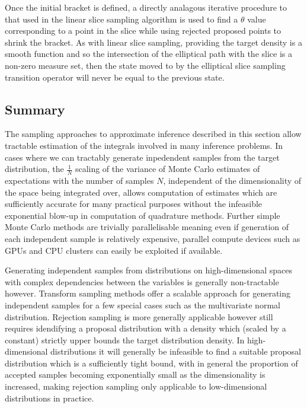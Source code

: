 Once the initial bracket is defined, a directly analagous iterative procedure to that used in the linear slice sampling algorithm is used to find a $\theta$ value corresponding to a point in the slice while using rejected proposed points to shrink the bracket. As with linear slice sampling, providing the target density is a smooth function and so the intersection of the elliptical path with the slice is a non-zero measure set, then the state moved to by the elliptical slice sampling transition operator will never be equal to the previous state.



\subsection{Summary}

The sampling approaches to approximate inference described in this section allow tractable estimation of the integrals involved in many inference problems. In cases where we can tractably generate inpedendent samples from the target distribution, the $\frac{1}{N}$ scaling of the variance of Monte Carlo estimates of expectations with the number of samples $N$, independent of the dimensionality of the space being integrated over, allows computation of estimates which are sufficiently accurate for many practical purposes without the infeasible exponential blow-up in computation of quadrature methods. Further simple Monte Carlo methods are trivially parallelisable meaning even if generation of each independent sample is relatively expensive, parallel compute devices such as \acp{GPU} and \ac{CPU} clusters can easily be exploited if available.

Generating independent samples from distributions on high-dimensional spaces with complex dependencies between the variables is generally non-tractable however. Transform sampling methods offer a scalable approach for generating independent samples for a few special cases such as the multivariate normal distribution. Rejection sampling is more generally applicable however still requires idendifying a proposal distribution with a density which (scaled by a constant) strictly upper bounds the target distribution density. In high-dimensional distributions it will generally be infeasible to find a suitable proposal distribution which is a sufficiently tight bound, with in general the proportion of accepted samples becoming exponentially small as the dimensionality is increased, making rejection sampling only applicable to low-dimensional distributions in practice.

